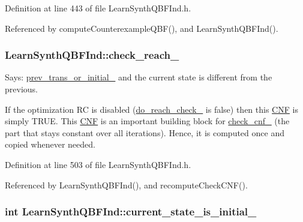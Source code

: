 Definition at line 443 of file Learn\-Synth\-Q\-B\-F\-Ind.\-h.



Referenced by compute\-Counterexample\-Q\-B\-F(), and Learn\-Synth\-Q\-B\-F\-Ind().

\hypertarget{classLearnSynthQBFInd_a6854254065f912e3d5fe07a1b895f1c6}{
\subsubsection[{check\-\_\-reach\-\_\-}]{ Learn\-Synth\-Q\-B\-F\-Ind\-::check\-\_\-reach\-\_\-\hspace{0.3cm}{\ttfamily [protected]}}}\label{classLearnSynthQBFInd_a6854254065f912e3d5fe07a1b895f1c6}


Says\-: \hyperlink{classLearnSynthQBFInd_ad99eafb7ee9134115f9fbe986e5eb0c5}{prev\-\_\-trans\-\_\-or\-\_\-initial\-\_\-} and the current state is different from the previous. 

If the optimization R\-C is disabled (\hyperlink{classLearnSynthQBFInd_af87e4a2c1d17c4c5bc398082d6d3e365}{do\-\_\-reach\-\_\-check\-\_\-} is false) then this \hyperlink{classCNF}{C\-N\-F} is simply T\-R\-U\-E. This \hyperlink{classCNF}{C\-N\-F} is an important building block for \hyperlink{classLearnSynthQBFInd_ac90a4574da82c96888db219291368554}{check\-\_\-cnf\-\_\-} (the part that stays constant over all iterations). Hence, it is computed once and copied whenever needed. 

Definition at line 503 of file Learn\-Synth\-Q\-B\-F\-Ind.\-h.



Referenced by Learn\-Synth\-Q\-B\-F\-Ind(), and recompute\-Check\-C\-N\-F().

\hypertarget{classLearnSynthQBFInd_a36e64e8ac156ca4978e73be5493de782}{
\subsubsection[{current\-\_\-state\-\_\-is\-\_\-initial\-\_\-}]{\setlength{\rightskip}{0pt plus 5cm}int Learn\-Synth\-Q\-B\-F\-Ind\-::current\-\_\-state\-\_\-is\-\_\-initial\-\_\-\hspace{0.3cm}{\ttfamily [protected]}}}\label{classLearnSynthQBFInd_a36e64e8ac156ca4978e73be5493de782}


